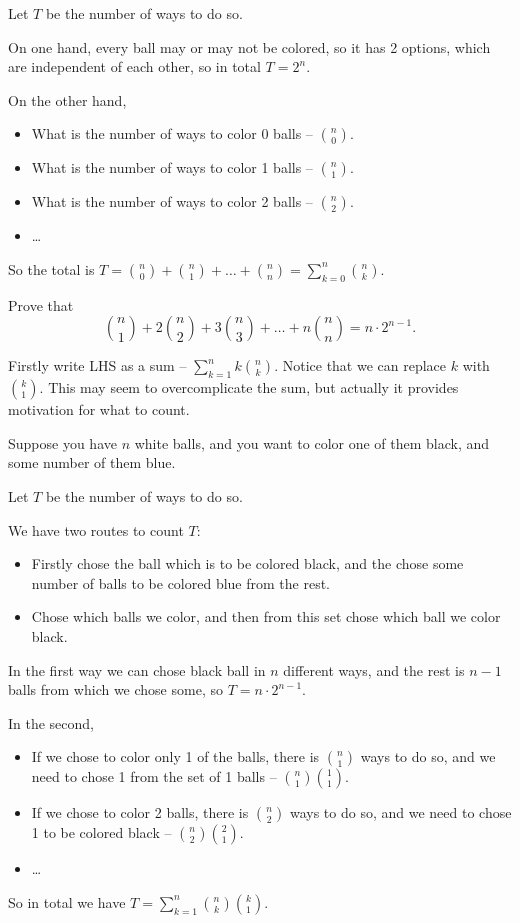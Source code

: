 Let $T$ be the number of ways to do so.

On one hand, every ball may or may not be colored, so it has 2 options, which are independent of each other, so in total $T=2^n$.

On the other hand,
\begin{itemize}
    \item What is the number of ways to color 0 balls -- $\binom n0$.
    \item What is the number of ways to color 1 balls -- $\binom n1$.
    \item What is the number of ways to color 2 balls -- $\binom n2$.
    \item \dots
\end{itemize}
So the total is $\displaystyle T=\binom n0+\binom n1+\dots+\binom nn=\sum_{k=0}^n\binom nk$.

\begin{example}
    Prove that \[\binom n1+2\binom n2+3\binom n3+\dots+n\binom nn=n\cdot2^{n-1}.\]
\end{example}

Firstly write LHS as a sum -- $\displaystyle \sum_{k=1}^nk\binom nk$. Notice that we can replace $k$ with $\binom k1$. This may seem to overcomplicate the sum, but actually it provides motivation for what to count.

Suppose you have $n$ white balls, and you want to color one of them black, and some number of them blue.

Let $T$ be the number of ways to do so.

We have two routes to count $T$:
\begin{itemize}
    \item Firstly chose the ball which is to be colored black, and the chose some number of balls to be colored blue from the rest.
    \item Chose which balls we color, and then from this set chose which ball we color black.
\end{itemize}

In the first way we can chose black ball in $n$ different ways, and the rest is $n-1$ balls from which we chose some, so $T=n\cdot2^{n-1}$.

In the second,
\begin{itemize}
    \item If we chose to color only 1 of the balls, there is $\binom n1$ ways to do so, and we need to chose 1 from the set of 1 balls -- $\binom n1\binom 11$.
    \item If we chose to color 2 balls, there is $\binom n2$ ways to do so, and we need to chose 1 to be colored black -- $\binom n2\binom 21$.
    \item \dots
\end{itemize}
So in total we have $T=\sum_{k=1}^n\binom nk\binom k1$.

